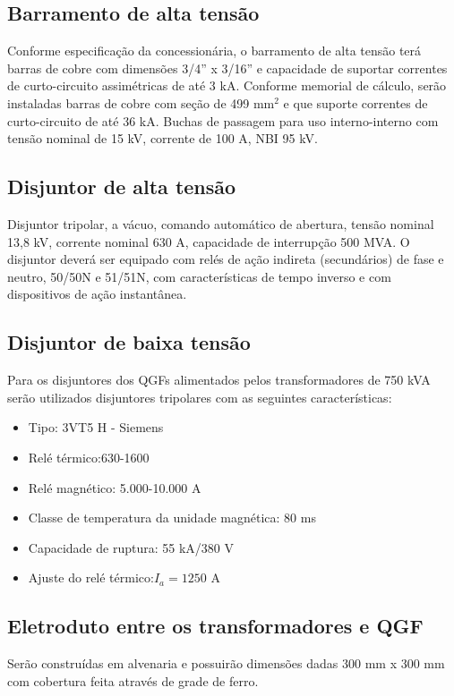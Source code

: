 \subsection{Barramento de alta tensão}
Conforme especificação da concessionária, o barramento de alta tensão terá barras de cobre com
dimensões 3/4” x 3/16” e capacidade de suportar correntes de curto-circuito assimétricas de até 3 kA.
Conforme memorial de cálculo, serão instaladas barras de cobre com seção de 499 mm$^2$ e que
suporte correntes de curto-circuito de até 36 kA.
Buchas de passagem para uso interno-interno com tensão nominal de 15 kV, corrente de 100 A,
NBI 95 kV.
\subsection{Disjuntor de alta tensão}
Disjuntor tripolar, a vácuo, comando automático de abertura, tensão nominal 13,8 kV, corrente
nominal 630 A, capacidade de interrupção 500 MVA. O disjuntor deverá ser equipado com relés
de ação indireta (secundários) de fase e neutro, 50/50N e 51/51N, com características de tempo inverso e
com dispositivos de ação instantânea.
\subsection{Disjuntor de baixa tensão}
Para os disjuntores dos QGFs alimentados pelos transformadores de 750 kVA serão utilizados disjuntores tripolares com as seguintes características:
\begin{itemize}
\item Tipo: 3VT5 H  - Siemens
\item Relé térmico:630-1600
\item Relé magnético: 5.000-10.000 A
\item Classe de temperatura da unidade magnética: 80 ms
\item Capacidade de ruptura: 55 kA/380 V
\item Ajuste do relé térmico:${I}_{a}=1250$ A
\end{itemize}

\subsection{Eletroduto entre os transformadores e QGF} %
Serão construídas em alvenaria e possuirão dimensões dadas 300 mm x 300 mm com cobertura
feita através de grade de ferro.


